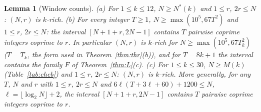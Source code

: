 \documentclass[11pt]{article}
\newtheorem{lemma}[theorem]{Lemma}
\theoremstyle{definition}
\theoremstyle{remark}
\begin{document}
\begin{lemma}[Window counts]\label{lem:win}
(a) For $1\le k\le12$, $N\ge N^*(k)$ and $1\le r$, $2r\le N$: $(N,r)$ is $k$-rich. (b) For every integer $T\ge1$, $N\ge\max(10^5,67T^2)$ and $1\le r$, $2r\le N$: the interval $[N+1+r,2N-1]$ contains $T$ pairwise coprime integers coprime to $r$. In particular $(N,r)$ is $k$-rich for $N\ge\max(10^5,67T_k^2)$ ($T=T_k$, the form used in Theorem~\ref{thm:thr}(b)), and for $T=8k+1$ the interval contains the family $F$ of Theorem~\ref{thm:L}(c). (c) For $1\le k\le30$, $N\ge M(k)$ (Table~\ref{tab:cheb}) and $1\le r$, $2r\le N$: $(N,r)$ is $k$-rich. More generally, for any $T$, $N$ and $r$ with $1\le r$, $2r\le N$ and $6\ell(T+3\ell+60)+1200\le N$, $\ell=\lfloor\log_2N\rfloor+2$, the interval $[N+1+r,2N-1]$ contains $T$ pairwise coprime integers coprime to $r$.
\end{lemma}
\end{document}
